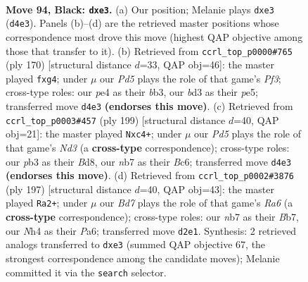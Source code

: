 \documentclass[11pt]{article}
\begin{document}
\clearpage

\begin{figure}[p]\centering
\begin{subfigure}{0.46\textwidth}\centering
\resizebox{\linewidth}{!}{%
\newchessgame
\chessboard[
  setfen={5k2/1Nn5/8/p7/P2pP2n/1P1BP3/K2b3p/8 b - - 0 94},
  showmover=false,
  pgfstyle=straightmove, color=movearrow, markmove={d4-e3}
]}
\caption{}
\end{subfigure}\hfill
\begin{subfigure}{0.46\textwidth}\centering
\resizebox{\linewidth}{!}{%
\newchessgame
\chessboard[
  setfen={8/4b1k1/2R2pp1/4p3/6pP/1bN2P2/6K1/8 w - - 0 86},
  showmover=false,
  pgfstyle=straightmove, color=movearrow, markmove={f3-g4}
]}
\caption{}
\end{subfigure}
\\[4pt]
\begin{subfigure}{0.46\textwidth}\centering
\resizebox{\linewidth}{!}{%
\newchessgame
\chessboard[
  setfen={3b4/5k2/2bn1p2/2p5/P1P2NP1/4K3/2B5/B7 b - - 0 100},
  showmover=false,
  pgfstyle=straightmove, color=movearrow, markmove={d6-c4}
]}
\caption{}
\end{subfigure}\hfill
\begin{subfigure}{0.46\textwidth}\centering
\resizebox{\linewidth}{!}{%
\newchessgame
\chessboard[
  setfen={8/1b1k4/p5p1/P2PBpP1/1PP5/r2B4/3K4/8 b - - 42 99},
  showmover=false,
  pgfstyle=straightmove, color=movearrow, markmove={a3-a2}
]}
\caption{}
\end{subfigure}
\caption{\textbf{Move 94, Black: \texttt{dxe3}.} (a) Our position; Melanie plays \texttt{dxe3} (\texttt{d4e3}). Panels (b)--(d) are the retrieved master positions whose correspondence most drove this move (highest QAP objective among those that transfer to it). (b) Retrieved from \texttt{ccrl\_top\_p0000\#765} (ply 170) [structural distance $d$=33, QAP obj=46]: the master played \texttt{fxg4}; under $\mu$ our \emph{Pd5} plays the role of that game's \emph{Pf3}; cross-type roles: our \emph{p}e4 as their \emph{b}b3, our \emph{b}d3 as their \emph{p}e5; transferred move \texttt{d4e3} \textbf{(endorses this move)}. (c) Retrieved from \texttt{ccrl\_top\_p0003\#457} (ply 199) [structural distance $d$=40, QAP obj=21]: the master played \texttt{Nxc4+}; under $\mu$ our \emph{Pd5} plays the role of that game's \emph{Nd3} (a \textbf{cross-type} correspondence); cross-type roles: our \emph{p}b3 as their \emph{B}d8, our \emph{n}b7 as their \emph{B}c6; transferred move \texttt{d4e3} \textbf{(endorses this move)}. (d) Retrieved from \texttt{ccrl\_top\_p0002\#3876} (ply 197) [structural distance $d$=40, QAP obj=43]: the master played \texttt{Ra2+}; under $\mu$ our \emph{Bd7} plays the role of that game's \emph{Ra6} (a \textbf{cross-type} correspondence); cross-type roles: our \emph{n}b7 as their \emph{B}b7, our \emph{N}h4 as their \emph{P}a6; transferred move \texttt{d2e1}. Synthesis: 2 retrieved analogs transferred to \texttt{dxe3} (summed QAP objective 67, the strongest correspondence among the candidate moves); Melanie committed it via the \texttt{search} selector.}
\label{fig:thought-m187}
\end{figure}
\end{document}
